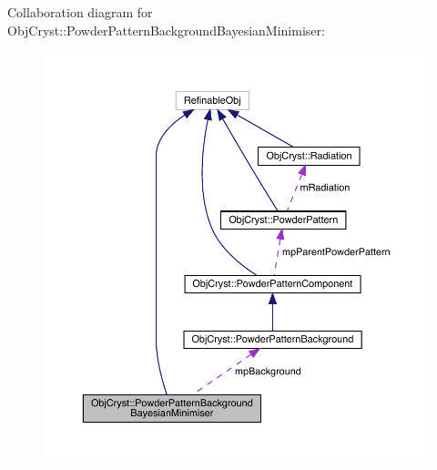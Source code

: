 Collaboration diagram for Obj\+Cryst\+::Powder\+Pattern\+Background\+Bayesian\+Minimiser\+:
\nopagebreak
\begin{figure}[H]
\begin{center}
\leavevmode
\includegraphics[width=350pt]{class_obj_cryst_1_1_powder_pattern_background_bayesian_minimiser__coll__graph}
\end{center}
\end{figure}
